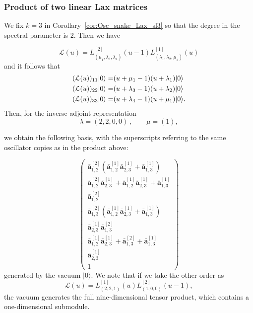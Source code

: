 \documentclass[12pt,reqno]{amsart}
\newcommand{\oad}{\bar{\mathbf{a}}}
\newcommand{\ket}[1]{{| #1 \rangle}}      %
\numberwithin{equation}{section}
\begin{document}
\subsubsection{Product of two linear Lax matrices}
We fix $k=3$ in Corollary~\ref{cor:Osc_snake_Lax_sl3} so that the degree in the spectral parameter is $2$. Then we have

\begin{equation}
 \mathcal{L}(u)=
    L^{[2]}_{(\mu_{1},\lambda_3,\lambda_4)}(u-1) L^{[1]}_{(\lambda_1,\lambda_{2},\mu_{1})}(u)
\end{equation}
and it follows that
\begin{align}
		(\mathcal{L}(u))_{11}|0\rangle =& (u+\mu_{1}-1)(u+\lambda_1)|0\rangle\notag\\
		(\mathcal{L}(u))_{22}|0\rangle =& (u+\lambda_{3}-1)(u+\lambda_{2})|0\rangle\notag\\
		(\mathcal{L}(u))_{33}|0\rangle =& (u+\lambda_4-1)(u+\mu_{1})|0\rangle.\label{eqn:gl_3_lax_lowest_EV_deg2}
\end{align}
Then, for the inverse adjoint representation
\begin{equation}
 \lambda=(2,2,0,0)\,,\qquad \mu=(1),
\end{equation}
\begin{center}
\end{center}
we obtain the following basis, with the superscripts referring to the same
oscillator copies as in the product above:


\begin{equation}
\begin{pmatrix}
\oad_{1,2}^{[2]} (\oad_{1,2}^{[1]} \oad_{2,3}^{[1]} + \oad_{1,3}^{[1]}) \\
\oad_{1,2}^{[2]} \oad_{2,3}^{[1]} + \oad_{1,2}^{[1]} \oad_{2,3}^{[1]} + \oad_{1,3}^{[1]} \\
\oad_{1,2}^{[2]} \\
\oad_{1,3}^{[2]} (\oad_{1,2}^{[1]} \oad_{2,3}^{[1]} + \oad_{1,3}^{[1]}) \\
\oad_{2,3}^{[1]} \oad_{1,3}^{[2]} \\
\oad_{1,2}^{[1]} \oad_{2,3}^{[1]} + \oad_{1,3}^{[2]} + \oad_{1,3}^{[1]} \\
\oad_{2,3}^{[1]} \\
1
\end{pmatrix}
\end{equation}
generated by the vacuum $\ket{0}$.
We note that if we take the other order as
\begin{equation}
 \mathcal{L}(u)=L^{[1]}_{(2,2,1)}(u)
    L^{[2]}_{(1,0,0)}(u-1), 
\end{equation}
the vacuum generates the full nine-dimensional tensor product,
which contains a one-dimensional submodule.
\end{document}
